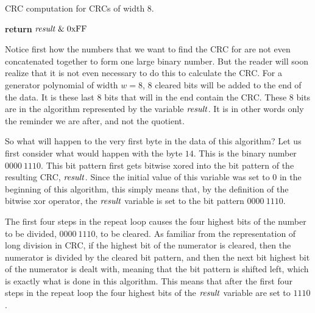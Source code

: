 \begin{algorithm}[H]
  \caption{CRC computation for CRCs of width 8.}
  \label{alg:crc8-comp}
  \begin{algorithmic}[1]


    \Else
    \EndIf
    \EndRepeatn

    \EndForEach

    \State \textbf{return}  $\mathit{result} \mathrel{\&} \mathrm{0xFF}$
    \EndProcedure

  \end{algorithmic}
\end{algorithm}

Notice first how the numbers that we want to find the CRC for are not
even concatenated together to form one large binary number.  But the
reader will soon realize that it is not even necessary to do this to
calculate the CRC.  For a generator polynomial of width $w=8$, $8$
cleared bits will be added to the end of the data. It is these last
$8$ bits that will in the end contain the CRC. These 8 bits are in the
algorithm represented by the variable $\mathit{result}$. It is in other words
only the reminder we are after, and not the quotient.

So what will happen to the very first byte in the data of this
algorithm? Let us first consider what would happen with the byte
$14$. This is the binary number $0000\ 1110$. This bit pattern first
gets bitwise xored into the bit pattern of the resulting CRC,
$\mathit{result}$. Since the initial value of this variable was set to $0$ in
the beginning of this algorithm, this simply means that, by the
definition of the bitwise xor operator, the $\mathit{result}$ variable is set
to the bit pattern $0000\ 1110$.

The first four steps in the repeat loop causes the four highest bits
of the number to be divided, $0000\ 1110$, to be cleared. As familiar
from the representation of long division in CRC, if the highest bit of
the numerator is cleared, then the numerator is divided by the cleared
bit pattern, and then the next bit highest bit of the numerator is
dealt with, meaning that the bit pattern is shifted left, which is
exactly what is done in this algorithm. This means that after the
first four steps in the repeat loop the four highest bits of the
$\mathit{result}$ variable are set to $1110$.

